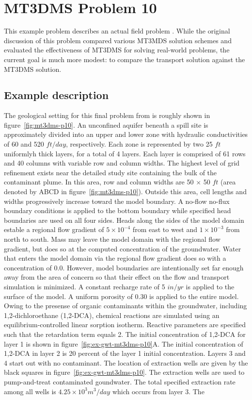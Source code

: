 \section{MT3DMS Problem 10}

This example problem describes an actual field problem \citep{zheng1999mt3dms}.  While the original discussion of this problem compared various MT3MDS solution schemes and evaluated the effectiveness of MT3DMS for solving real-world problems, the current goal is much more modest: to compare the \mf transport solution against the MT3DMS solution.  

\subsection{Example description}

The geological setting for this final problem from \cite{zheng1999mt3dms} is roughly shown in figure~\ref{fig:mt3dms-p10}.  An unconfined aquifer beneath a spill site is approximately divided into an upper and lower zone with hydraulic conductivities of 60 and 520 $ft/day$, respectively.  Each zone is represented by two 25 $ft$ uniformlyh thick layers, for a total of 4 layers.  Each layer is comprised of 61 rows and 40 columns with variable row and column widths.  The highest level of grid refinement exists near the detailed study site containing the bulk of the contaminant plume.  In this area, row and column widths are 50 $\times$ 50 $ft$ (area denoted by ABCD in figure~\ref{fig:mt3dms-p10}). Outside this area, cell lengths and widths progressively increase toward the model boundary.  A no-flow no-flux boundary conditions is applied to the bottom boundary while specified head boundaries are used on all four sides.  Heads along the sides of the model domain estable a regional flow gradient of $5 \times 10^{-4}$ from east to west and $1 \times 10^{-3}$ from north to south.  Mass may leave the model domain with the regional flow gradient, but does so at the computed concentration of the groundwater. Water that enters the model domain via the regional flow gradient does so with a concentration of 0.0.  However, model boundaries are intentionally set far enough away from the area of concern so that their effect on the flow and transport simulation is minimized.  A constant recharge rate of 5 $in/yr$ is applied to the surface of the model.  A uniform porosity of 0.30 is applied to the entire model.  Owing to the presense of organic contaminants within the groundwater, including 1,2-dichloroethane (1,2-DCA), chemical reactions are simulated using an equilibrium-controlled linear sorption isotherm.  Reactive parameters are specified such that the retardation term equals 2.  The initial concentration of 1,2-DCA for layer 1 is shown in figure~\ref{fig:ex-gwt-mt3dms-p10}A. The initial concentration of 1,2-DCA in layer 2 is 20 percent of the layer 1 initial concentration.  Layers 3 and 4 start out with no contaminant.  The location of extraction wells are given by the black squares in figure~\ref{fig:ex-gwt-mt3dms-p10}. The extraction wells are used to pump-and-treat contaminated goundwater.  The total specified extraction rate among all wells is $4.25 \times 10^3 m^3/day$ which occurs from layer 3. The 